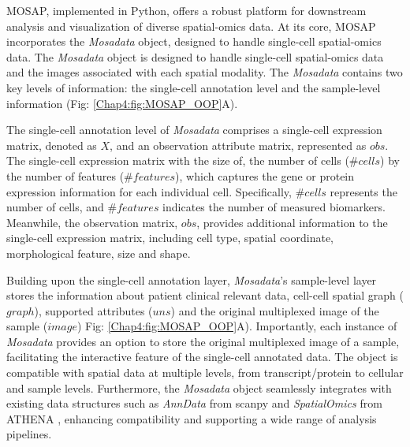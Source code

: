 MOSAP, implemented in Python, offers a robust platform for downstream analysis and visualization of diverse spatial-omics data. At its core, MOSAP incorporates the \textit{Mosadata} object, designed to handle single-cell spatial-omics data.  The \textit{Mosadata} object is designed to handle single-cell spatial-omics data and the images associated with each spatial modality. The \textit{Mosadata} contains two key levels of information: the single-cell annotation level and the sample-level information (Fig: \ref{Chap4:fig:MOSAP_OOP}A). 

The single-cell annotation level of \textit{Mosadata} comprises a single-cell expression matrix, denoted as $X$, and an observation attribute matrix, represented as $obs$. The single-cell expression matrix with the size of, the number of cells ($\#cells$) by the number of features ($\#features$), which captures the gene or protein expression information for each individual cell. Specifically, $\#cells$ represents the number of cells, and $\#features$ indicates the number of measured biomarkers. Meanwhile, the observation matrix, $obs$, provides additional information to the single-cell expression matrix, including cell type, spatial coordinate, morphological feature, size and shape. 

Building upon the single-cell annotation layer, \textit{Mosadata}'s sample-level layer stores the information about patient clinical relevant data, cell-cell spatial graph ($graph$), supported attributes ($uns$) and the original multiplexed image of the sample ($image$) Fig: \ref{Chap4:fig:MOSAP_OOP}A). Importantly, each instance of \textit{Mosadata} provides an option to store the original multiplexed image of a sample, facilitating the interactive feature of the single-cell annotated data. The object is compatible with spatial data at multiple levels, from transcript/protein to cellular and sample levels. Furthermore, the \textit{Mosadata} object seamlessly integrates with existing data structures such as \textit{AnnData} from scanpy \cite{wolf2018scanpy} and \textit{SpatialOmics} from ATHENA \cite{martinelli2022athena}, enhancing compatibility and supporting a wide range of analysis pipelines.  

